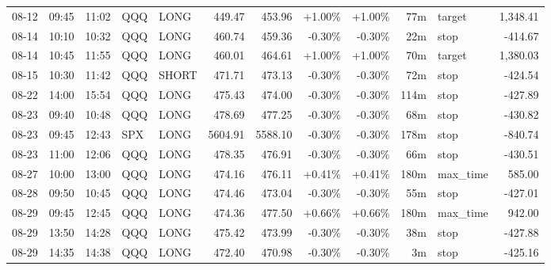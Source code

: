 \documentclass[11pt,a4paper,twoside]{article}
\begin{document}
\begin{center}
\begin{longtable}{>{\color{txtmain}}l l l l l r r r r r >{\color{txtmain}}l r}
08-12 & 09:45 & 11:02 & QQQ & LONG & 449.47 & 453.96 & \textcolor{wingreen}{+1.00\%} & \textcolor{wingreen}{+1.00\%} & 77m & target & \textcolor{wingreen}{1,348.41} \\
08-14 & 10:10 & 10:32 & QQQ & LONG & 460.74 & 459.36 & \textcolor{lossred}{-0.30\%} & \textcolor{lossred}{-0.30\%} & 22m & stop & \textcolor{lossred}{-414.67} \\
08-14 & 10:45 & 11:55 & QQQ & LONG & 460.01 & 464.61 & \textcolor{wingreen}{+1.00\%} & \textcolor{wingreen}{+1.00\%} & 70m & target & \textcolor{wingreen}{1,380.03} \\
08-15 & 10:30 & 11:42 & QQQ & SHORT & 471.71 & 473.13 & \textcolor{lossred}{-0.30\%} & \textcolor{lossred}{-0.30\%} & 72m & stop & \textcolor{lossred}{-424.54} \\
08-22 & 14:00 & 15:54 & QQQ & LONG & 475.43 & 474.00 & \textcolor{lossred}{-0.30\%} & \textcolor{lossred}{-0.30\%} & 114m & stop & \textcolor{lossred}{-427.89} \\
08-23 & 09:40 & 10:48 & QQQ & LONG & 478.69 & 477.25 & \textcolor{lossred}{-0.30\%} & \textcolor{lossred}{-0.30\%} & 68m & stop & \textcolor{lossred}{-430.82} \\
08-23 & 09:45 & 12:43 & SPX & LONG & 5604.91 & 5588.10 & \textcolor{lossred}{-0.30\%} & \textcolor{lossred}{-0.30\%} & 178m & stop & \textcolor{lossred}{-840.74} \\
08-23 & 11:00 & 12:06 & QQQ & LONG & 478.35 & 476.91 & \textcolor{lossred}{-0.30\%} & \textcolor{lossred}{-0.30\%} & 66m & stop & \textcolor{lossred}{-430.51} \\
08-27 & 10:00 & 13:00 & QQQ & LONG & 474.16 & 476.11 & \textcolor{wingreen}{+0.41\%} & \textcolor{wingreen}{+0.41\%} & 180m & max\_time & \textcolor{wingreen}{585.00} \\
08-28 & 09:50 & 10:45 & QQQ & LONG & 474.46 & 473.04 & \textcolor{lossred}{-0.30\%} & \textcolor{lossred}{-0.30\%} & 55m & stop & \textcolor{lossred}{-427.01} \\
08-29 & 09:45 & 12:45 & QQQ & LONG & 474.36 & 477.50 & \textcolor{wingreen}{+0.66\%} & \textcolor{wingreen}{+0.66\%} & 180m & max\_time & \textcolor{wingreen}{942.00} \\
08-29 & 13:50 & 14:28 & QQQ & LONG & 475.42 & 473.99 & \textcolor{lossred}{-0.30\%} & \textcolor{lossred}{-0.30\%} & 38m & stop & \textcolor{lossred}{-427.88} \\
08-29 & 14:35 & 14:38 & QQQ & LONG & 472.40 & 470.98 & \textcolor{lossred}{-0.30\%} & \textcolor{lossred}{-0.30\%} & 3m & stop & \textcolor{lossred}{-425.16} \\

\end{longtable}
\end{center}
\end{document}
